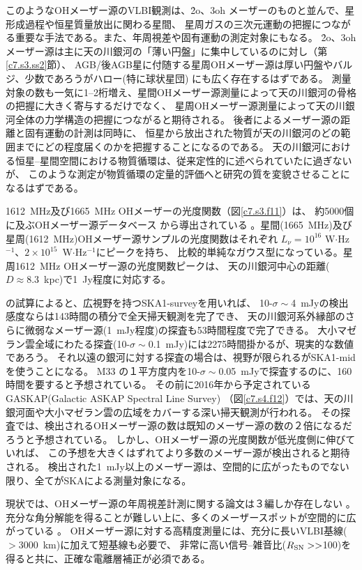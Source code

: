 このようなOHメーザー源のVLBI観測は、\h2o、\ch3oh メーザーのものと並んで、星形成過程や恒星質量放出に関わる星間、
星周ガスの三次元運動の把握につながる重要な手法である。また、年周視差や固有運動の測定対象にもなる。
\h2o、\ch3oh メーザー源は主に天の川銀河の「薄い円盤」に集中しているのに対し（第\ref{c7.s3.ss2}節）、
AGB/後AGB星に付随する星周OHメーザー源は厚い円盤やバルジ、少数であろうがハロー(特に球状星団)
にも広く存在するはずである。
測量対象の数も一気に1--2桁増え、星間OHメーザー源測量によって天の川銀河の骨格の把握に大きく寄与するだけでなく、
星周OHメーザー源測量によって天の川銀河全体の力学構造の把握につながると期待される。
後者によるメーザー源の距離と固有運動の計測は同時に、
恒星から放出された物質が天の川銀河のどの範囲までにどの程度届くのかを把握することになるのである。
天の川銀河における恒星--星間空間における物質循環は、従来定性的に述べられていたに過ぎないが、
このような測定が物質循環の定量的評価へと研究の質を変貌させることになるはずである。

1612~MHz及び1665~MHz OHメーザーの光度関数（図\ref{c7.s3.f11}）は、
約5000個に及ぶOHメーザー源データベース\citep{2012IAUS..287..254E}
から導出されている\cite{Etoka...2014} 。星間(1665~MHz)及び星周(1612~MHz)OHメーザー源サンプルの光度関数はそれぞれ
$L_{\nu}=10^{16}$ W$\cdot$Hz$^{-1}$、$2\times 10^{15}$~W$\cdot$Hz$^{-1}$にピークを持ち、
比較的単純なガウス型になっている。星周1612~MHz OHメーザー源の光度関数ピークは、
天の川銀河中心の距離($D\approx 8.3$~kpc)で1~Jy程度に対応する。

\citet{Etoka...2014}の試算によると、広視野を持つSKA1-surveyを用いれば、
10-$\sigma\sim$4~mJyの検出感度ならは143時間の積分で全天掃天観測を完了でき、
天の川銀河系外縁部のさらに微弱なメーザー源(1~mJy程度)の探査も53時間程度で完了できる。
大小マゼラン雲全域にわたる探査(10-$\sigma\sim$0.1~mJy)には2275時間掛かるが、現実的な数値であろう。
それ以遠の銀河に対する探査の場合は、視野が限られるがSKA1-midを使うことになる。
M33 の１平方度内を10-$\sigma\sim$0.05~mJyで探査するのに、160時間を要すると予想されている。
その前に2016年から予定されているGASKAP(Galactic ASKAP Spectral Line Survey)\citep{2013PASA...30....3D}
（図\ref{c7.s4.f12}）では、天の川銀河面や大小マゼラン雲の広域をカバーする深い掃天観測が行われる。
その探査では、検出されるOHメーザー源の数は既知のメーザー源の数の２倍になるだろうと予想されている。
しかし、OHメーザー源の光度関数が低光度側に伸びていれば、
この予想を大きくはずれてより多数のメーザー源が検出されると期待される。
検出された1~mJy以上のメーザー源は、空間的に広がったものでない限り、全てがSKAによる測量対象になる。

現状では、OHメーザー源の年周視差計測に関する論文は３編しか存在しない
\citep{2000A&A...357..945V, 2003A&A...407..213V,2007A&A...472..547V}。
充分な角分解能を得ることが難しい上に、多くのメーザースポットが空間的に広がっている
\citep{2013ApJ...773..182I,2013ApJ...771...47I} 。
OHメーザー源に対する高精度測量には、充分に長いVLBI基線($>$3000~km)に加えて短基線も必要で、
非常に高い信号--雑音比($R_{\rm SN}>>$100)を得ると共に、正確な電離層補正が必須である。


